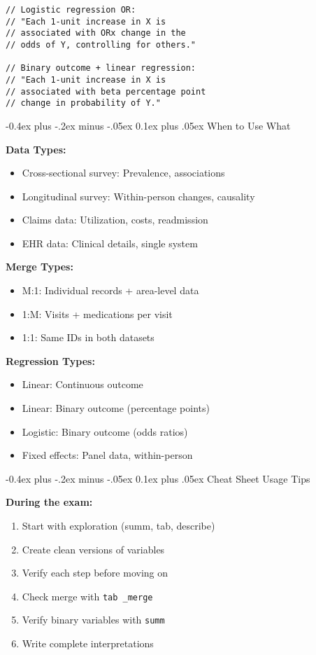 \documentclass[8pt,landscape,a4paper]{article}
\makeatletter
\renewcommand{\subsection}{\@startsection{subsection}{2}{0mm}%
                                {-0.4ex plus -.2ex minus -.05ex}%
                                {0.1ex plus .05ex}%
                                {\normalfont\fontsize{7.5pt}{7.5pt}\selectfont\bfseries\color{myblue}}}
\makeatother
\begin{document}
\begin{multicols}{3}
\begin{lstlisting}
// Logistic regression OR:
// "Each 1-unit increase in X is
// associated with ORx change in the
// odds of Y, controlling for others."

// Binary outcome + linear regression:
// "Each 1-unit increase in X is
// associated with beta percentage point
// change in probability of Y."
\end{lstlisting}

\subsection{When to Use What}

\textbf{Data Types:}
\begin{itemize}
\item Cross-sectional survey: Prevalence, associations
\item Longitudinal survey: Within-person changes, causality
\item Claims data: Utilization, costs, readmission
\item EHR data: Clinical details, single system
\end{itemize}

\textbf{Merge Types:}
\begin{itemize}
\item M:1: Individual records + area-level data
\item 1:M: Visits + medications per visit
\item 1:1: Same IDs in both datasets
\end{itemize}

\textbf{Regression Types:}
\begin{itemize}
\item Linear: Continuous outcome
\item Linear: Binary outcome (percentage points)
\item Logistic: Binary outcome (odds ratios)
\item Fixed effects: Panel data, within-person
\end{itemize}

\subsection{Cheat Sheet Usage Tips}
\begin{tipbox}
\textbf{During the exam:}
\begin{enumerate}
\item Start with exploration (summ, tab, describe)
\item Create clean versions of variables
\item Verify each step before moving on
\item Check merge with \texttt{tab \_merge}
\item Verify binary variables with \texttt{summ}
\item Write complete interpretations
\end{enumerate}
\end{tipbox}


\end{multicols}
\end{document}
